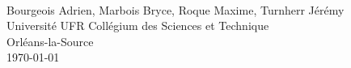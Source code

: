 \documentclass[12pt]{article}%
\begin{document}
\pagestyle{empty}

\begin{titlepage}
\begin{center}
\\
\vspace{2cm}
{\Large Bourgeois Adrien, Marbois Bryce, Roque Maxime, Turnherr Jérémy
\\Université UFR Collégium des Sciences et Technique
\\Orléans-la-Source}\\
\vfill
{\large\today}
\end{center}
\end{titlepage}



\clearpage

\tableofcontents

\cleardoublepage

\pagestyle{fancy}

























\appendix

\printglossaries

{}


\end{document}
